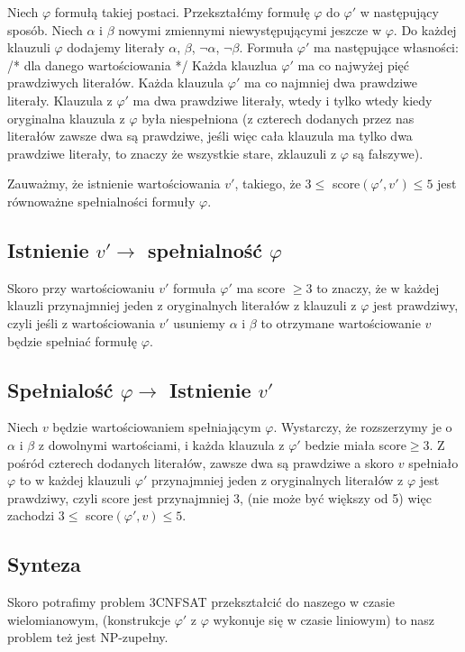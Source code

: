 \documentclass{article}
\begin{document}
Niech $\varphi$ formułą takiej postaci. \newline
Przekształćmy formułę $\varphi$ do $\varphi'$ w następujący sposób.
Niech $\alpha$ i $\beta$ nowymi zmiennymi niewystępującymi jeszcze w $\varphi$. Do każdej klauzuli
$\varphi$ dodajemy literały $\alpha$, $\beta$, $\neg \alpha$, $\neg \beta$. \newline \newline
Formuła $\varphi'$ ma następujące własności: 
/* dla danego wartościowania */ \newline \newline
Każda klauzlua $\varphi'$ ma co najwyżej pięć prawdziwych literałów. \newline
Każda klauzula $\varphi'$ ma co najmniej dwa prawdziwe literały. \newline
Klauzula z $\varphi'$ ma dwa prawdziwe literały, wtedy i tylko wtedy kiedy oryginalna klauzula z $\varphi$ była niespełniona (z czterech dodanych przez nas literałów zawsze dwa są prawdziwe, jeśli więc cała klauzula ma tylko dwa prawdziwe literały, to znaczy że wszystkie stare, zklauzuli z $\varphi$ są fałszywe).

Zauważmy, że istnienie wartościowania $v'$, takiego, że $3 \le$ score$(\varphi', v') \le 5$
jest równoważne spełnialności formuły $\varphi$. \newline

\newpage
\subsection*{Istnienie $v' \to$ spełnialność $\varphi$}
Skoro przy wartościowaniu $v'$ formuła $\varphi'$ ma score $\ge3$ to znaczy, że w każdej klauzli przynajmniej jeden z oryginalnych literałów z klauzuli z $\varphi$ jest prawdziwy, czyli jeśli z wartościowania $v'$ usuniemy $\alpha$ i $\beta$ to otrzymane wartościowanie $v$ będzie spełniać formułę $\varphi$.

\subsection*{Spełnialość $\varphi \to$ Istnienie $v'$}
Niech $v$ będzie wartościowaniem spełniającym $\varphi$. Wystarczy, że rozszerzymy je o $\alpha$ i $\beta$ z dowolnymi wartościami, i każda klauzula z $\varphi'$ bedzie miała score$\ge3$.
Z pośród czterech dodanych literałów, zawsze dwa są prawdziwe a skoro $v$ spełniało $\varphi$ to w każdej klauzuli $\varphi'$ przynajmniej jeden z oryginalnych literałów z $\varphi$ jest prawdziwy, czyli score jest przynajmniej 3, (nie może być większy od 5) więc zachodzi $3\le$ score$(\varphi', v)\le5$.

\subsection*{Synteza}
Skoro potrafimy problem 3CNFSAT przekształcić do naszego w czasie wielomianowym, (konstrukcje $\varphi'$ z $\varphi$ wykonuje się w czasie liniowym) to nasz problem też jest NP-zupełny.
\end{document}

